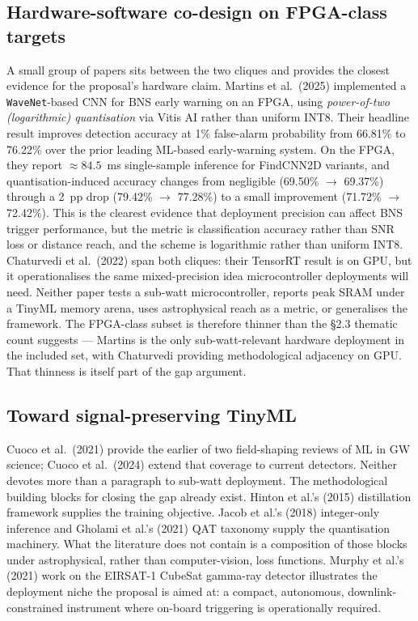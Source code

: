 \documentclass[11pt,a4paper]{article}
\begin{document}
\subsection{Hardware-software co-design on FPGA-class targets}
A small group of papers sits between the two cliques and provides the closest evidence for the proposal's hardware claim. Martins et al.\ (2025) implemented a \texttt{WaveNet}-based CNN for BNS early warning on an FPGA, using \textit{power-of-two (logarithmic) quantisation} via Vitis AI rather than uniform INT8. Their headline result improves detection accuracy at 1\% false-alarm probability from 66.81\% to 76.22\% over the prior leading ML-based early-warning system. On the FPGA, they report $\approx 84.5$~ms single-sample inference for FindCNN2D variants, and quantisation-induced accuracy changes from negligible (69.50\% $\to$ 69.37\%) through a 2~pp drop (79.42\% $\to$ 77.28\%) to a small improvement (71.72\% $\to$ 72.42\%). This is the clearest evidence that deployment precision can affect BNS trigger performance, but the metric is classification accuracy rather than SNR loss or distance reach, and the scheme is logarithmic rather than uniform INT8. Chaturvedi et al.\ (2022) span both cliques: their TensorRT result is on GPU, but it operationalises the same mixed-precision idea microcontroller deployments will need. Neither paper tests a sub-watt microcontroller, reports peak SRAM under a TinyML memory arena, uses astrophysical reach as a metric, or generalises the framework. The FPGA-class subset is therefore thinner than the §2.3 thematic count suggests — Martins is the only sub-watt-relevant hardware deployment in the included set, with Chaturvedi providing methodological adjacency on GPU. That thinness is itself part of the gap argument.

\subsection{Toward signal-preserving TinyML}
Cuoco et al.\ (2021) provide the earlier of two field-shaping reviews of ML in GW science; Cuoco et al.\ (2024) extend that coverage to current detectors. Neither devotes more than a paragraph to sub-watt deployment. The methodological building blocks for closing the gap already exist. Hinton et al.'s (2015) distillation framework supplies the training objective. Jacob et al.'s (2018) integer-only inference and Gholami et al.'s (2021) QAT taxonomy supply the quantisation machinery. What the literature does not contain is a composition of those blocks under astrophysical, rather than computer-vision, loss functions. Murphy et al.'s (2021) work on the EIRSAT-1 CubeSat gamma-ray detector illustrates the deployment niche the proposal is aimed at: a compact, autonomous, downlink-constrained instrument where on-board triggering is operationally required.
\end{document}
